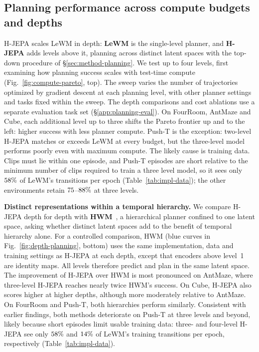 \subsection{Planning performance across compute budgets and depths}
\label{sec:planning-performance}

H-JEPA scales LeWM in depth:
\textbf{LeWM} is the single-level planner, and \textbf{H-JEPA} adds levels
above it, planning across distinct latent spaces with the top-down procedure of
\S\ref{sec:method-planning}. We test up to four levels, first examining
how planning success scales with test-time compute
(Fig.~\ref{fig:compute-pareto}, top). The sweep
varies the number of trajectories optimized by gradient descent at each
planning level, with other planner settings and tasks fixed within the sweep.
The depth comparisons and cost ablations use a separate evaluation task set
(\S\ref{app:planning-eval}). On FourRoom, AntMaze and
Cube, each additional level up to three shifts the Pareto frontier up and to the
left: higher success with less planner compute.
Push-T is the exception: two-level H-JEPA matches or exceeds
LeWM at every budget, but the three-level model performs poorly even with maximum compute. The likely cause is training
data. Clips must lie within one episode, and Push-T episodes
are short relative to the minimum number of clips required to train a three level model, so it sees only
$58\%$ of LeWM's transitions per epoch
(Table~\ref{tab:impl-data}); the other environments retain
$75$--$88\%$ at three levels.

\textbf{Distinct representations within a temporal hierarchy.}
We compare H-JEPA depth for depth with \textbf{HWM}~\citep{zhang2026hierarchical},
a hierarchical planner confined to one latent space, asking whether
distinct latent spaces add to the benefit of temporal
hierarchy alone. For a controlled comparison, HWM (blue curves in
Fig.~\ref{fig:depth-planning}, bottom) uses the same implementation, data and
training settings as H-JEPA at each depth, except that encoders above level~1
are identity maps. All levels therefore predict and plan in the same
latent space.
The improvement of H-JEPA over HWM is most pronounced on AntMaze,
where three-level H-JEPA reaches nearly twice
HWM's success.
On Cube, H-JEPA also scores higher at higher depths,
although more moderately relative to AntMaze.
On FourRoom and Push-T, both hierarchies perform similarly. Consistent with earlier findings,
both methods deteriorate on Push-T at three levels and beyond, likely because
short episodes limit usable training data: three- and four-level H-JEPA see only
$58\%$ and $14\%$ of LeWM's training
transitions per epoch, respectively (Table~\ref{tab:impl-data}).

